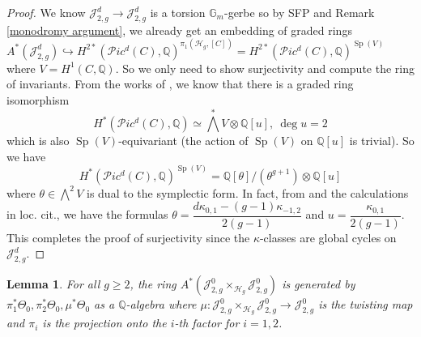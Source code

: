 \documentclass[11pt]{amsart}
\newtheorem{lemma}[theorem]{Lemma}
\theoremstyle{definition}
\newcommand{\ri}{\rightarrow}
\newcommand{\jac}{\mathcal{J}}
\newcommand{\h}{\mathcal{H}}
\newcommand{\Q}{\mathbb{Q}}
\newcommand{\T}{\Theta}
\begin{document}
\begin{proof}
    We know $\mathscr J^{d}_{2,g} \rightarrow \mathcal J^d_{2,g}$ is a torsion $\mathbb G_m$-gerbe so by SFP and Remark \ref{monodromy argument}, we already get an embedding of graded rings $A^*(\mathscr J^d_{2,g}) \hookrightarrow H^{2*}(\mathscr Pic^d(C), \mathbb Q)^{\pi_1(\mathcal H_g, [C])}=H^{2*}(\mathscr Pic^d(C), \mathbb Q)^{\operatorname{Sp}(V)} $ where $V=H^1(C,\mathbb Q)$. So we only need to show surjectivity and compute the ring of invariants. From the works of \cite{MR3013029}, we know that there is a graded ring isomorphism \begin{equation*}
        H^* (\mathscr Pic^d(C),\mathbb Q) \simeq \bigwedge^* V \otimes \mathbb Q[u], \ \deg u=2
    \end{equation*} which is also $\operatorname{Sp}(V)$-equivariant (the action of $\operatorname{Sp}(V)$ on $\mathbb Q[u]$ is trivial). So we have \begin{equation*}
        H^{*}(\mathscr Pic^d(C), \mathbb Q)^{\operatorname{Sp}(V)} = \mathbb Q[\theta]/(\theta^{g+1}) \otimes \mathbb Q[u]
    \end{equation*}    where $\theta \in \bigwedge^2 V$ is dual to the symplectic form. In fact, from \cite[Theorem 4.7]{MR3013029} and the calculations in loc. cit., we have the formulas $\theta = \dfrac{d\kappa_{0,1}-(g-1)\kappa_{-1,2}}{2(g-1)}$ and $u=\dfrac{\kappa_{0,1}}{2(g-1)}$. This completes the proof of surjectivity since the $\kappa$-classes are global cycles on $\mathscr J^d_{2,g}$. 
\end{proof}
\begin{lemma}\label{lem:jxj-gen}
    For all $g\geq 2$, the ring $A^*(\jac^0_{2,g}\times_{\h_g}\jac^{0}_{2,g})$ is generated by $\pi_1^*\T_0,\pi_2^*\T_0,\mu^*\T_0$ as a $\Q$-algebra where $\mu:\jac^0_{2,g}\times_{\h_g}\jac^{0}_{2,g}\ri \jac^0_{2,g}$ is the twisting map and $\pi_i$ is the projection onto the $i$-th factor for $i=1,2$.
\end{lemma}
\end{document}

